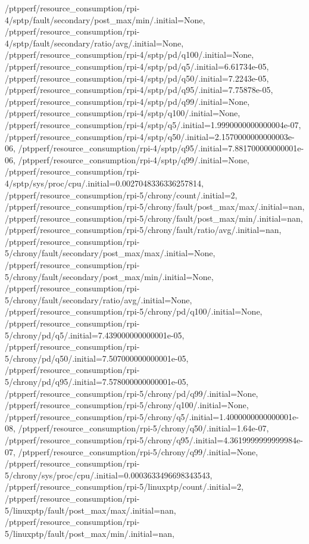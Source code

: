 {    /ptpperf/resource_consumption/rpi-4/sptp/fault/secondary/post_max/min/.initial=None,
    /ptpperf/resource_consumption/rpi-4/sptp/fault/secondary/ratio/avg/.initial=None,
    /ptpperf/resource_consumption/rpi-4/sptp/pd/q100/.initial=None,
    /ptpperf/resource_consumption/rpi-4/sptp/pd/q5/.initial=6.61734e-05,
    /ptpperf/resource_consumption/rpi-4/sptp/pd/q50/.initial=7.2243e-05,
    /ptpperf/resource_consumption/rpi-4/sptp/pd/q95/.initial=7.75878e-05,
    /ptpperf/resource_consumption/rpi-4/sptp/pd/q99/.initial=None,
    /ptpperf/resource_consumption/rpi-4/sptp/q100/.initial=None,
    /ptpperf/resource_consumption/rpi-4/sptp/q5/.initial=1.9990000000000004e-07,
    /ptpperf/resource_consumption/rpi-4/sptp/q50/.initial=2.1570000000000003e-06,
    /ptpperf/resource_consumption/rpi-4/sptp/q95/.initial=7.881700000000001e-06,
    /ptpperf/resource_consumption/rpi-4/sptp/q99/.initial=None,
    /ptpperf/resource_consumption/rpi-4/sptp/sys/proc/cpu/.initial=0.0027048336336257814,
    /ptpperf/resource_consumption/rpi-5/chrony/count/.initial=2,
    /ptpperf/resource_consumption/rpi-5/chrony/fault/post_max/max/.initial=nan,
    /ptpperf/resource_consumption/rpi-5/chrony/fault/post_max/min/.initial=nan,
    /ptpperf/resource_consumption/rpi-5/chrony/fault/ratio/avg/.initial=nan,
    /ptpperf/resource_consumption/rpi-5/chrony/fault/secondary/post_max/max/.initial=None,
    /ptpperf/resource_consumption/rpi-5/chrony/fault/secondary/post_max/min/.initial=None,
    /ptpperf/resource_consumption/rpi-5/chrony/fault/secondary/ratio/avg/.initial=None,
    /ptpperf/resource_consumption/rpi-5/chrony/pd/q100/.initial=None,
    /ptpperf/resource_consumption/rpi-5/chrony/pd/q5/.initial=7.439000000000001e-05,
    /ptpperf/resource_consumption/rpi-5/chrony/pd/q50/.initial=7.507000000000001e-05,
    /ptpperf/resource_consumption/rpi-5/chrony/pd/q95/.initial=7.578000000000001e-05,
    /ptpperf/resource_consumption/rpi-5/chrony/pd/q99/.initial=None,
    /ptpperf/resource_consumption/rpi-5/chrony/q100/.initial=None,
    /ptpperf/resource_consumption/rpi-5/chrony/q5/.initial=1.4000000000000001e-08,
    /ptpperf/resource_consumption/rpi-5/chrony/q50/.initial=1.64e-07,
    /ptpperf/resource_consumption/rpi-5/chrony/q95/.initial=4.3619999999999984e-07,
    /ptpperf/resource_consumption/rpi-5/chrony/q99/.initial=None,
    /ptpperf/resource_consumption/rpi-5/chrony/sys/proc/cpu/.initial=0.0003633496698343543,
    /ptpperf/resource_consumption/rpi-5/linuxptp/count/.initial=2,
    /ptpperf/resource_consumption/rpi-5/linuxptp/fault/post_max/max/.initial=nan,
    /ptpperf/resource_consumption/rpi-5/linuxptp/fault/post_max/min/.initial=nan,
}
